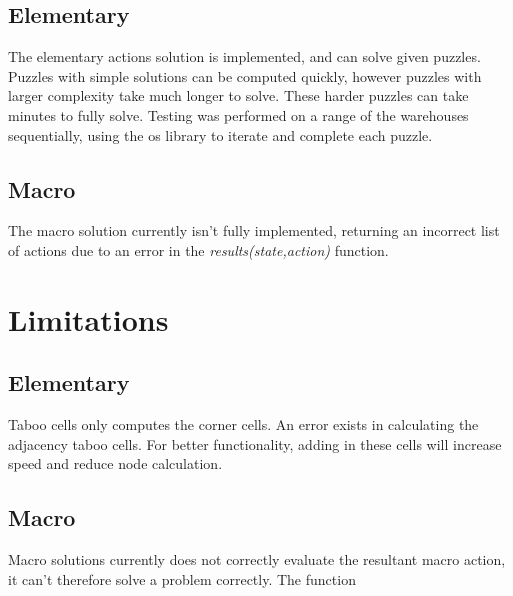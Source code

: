 \documentclass[]{article}
\begin{document}
\subsection{Elementary}
The elementary actions solution is implemented, and can solve given puzzles. Puzzles with simple solutions can be computed quickly, however puzzles with larger complexity take much longer to solve. These harder puzzles can take minutes to fully solve. Testing was performed on a range of the warehouses sequentially, using the os library to iterate and complete each puzzle. 
\subsection{Macro}
The macro solution currently isn't fully implemented, returning an incorrect list of actions due to an error in the\textit{ results(state,action)} function. 
\section{Limitations}
\subsection{Elementary}
Taboo cells only computes the corner cells. An error exists in calculating the adjacency taboo cells. For better functionality, adding in these cells will increase speed and reduce node calculation.
\subsection{Macro}
Macro solutions currently does not correctly evaluate the resultant macro action, it can't therefore solve a problem correctly. The function 
\end{document}
